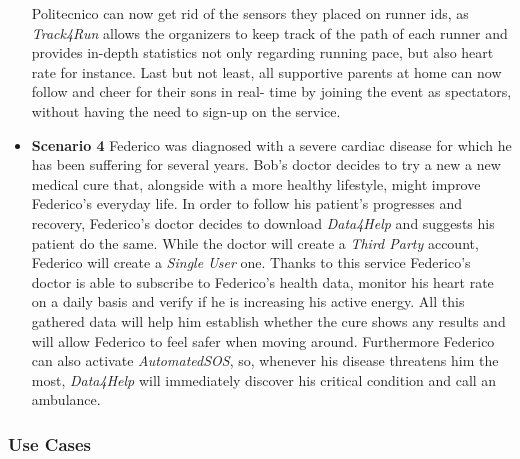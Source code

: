 \documentclass[titlepage]{article}
\begin{document}
\begin{itemize}
					Politecnico can now get rid of the sensors they placed on runner ids, as {\it Track4Run} allows the 						organizers to keep track of the path of each runner and provides in-depth statistics not only 						regarding running pace, but also heart rate for instance. 
					Last but not least, all supportive parents at home can now follow and cheer for their sons in real-					time by joining the event as spectators, without having the need to sign-up on the service.
					\item {\bf Scenario 4} \linebreak
					Federico was diagnosed with a severe cardiac disease for which he has been suffering for several 					years. Bob’s doctor decides to try a new a new medical cure that, alongside with a more healthy 					lifestyle, might improve Federico’s everyday life. In order to follow his patient’s progresses and 						recovery, Federico’s doctor decides to download {\it Data4Help} and suggests his patient do the same. 					While the doctor will create a {\it Third Party} account, Federico will create a {\it Single User} one. Thanks to 					this service Federico’s doctor is able to subscribe to Federico’s health data, monitor his heart rate 					on a daily basis and verify if he is increasing his active energy. All this gathered data will help him 					establish whether the cure shows any results and will allow Federico to feel safer when moving 					around. Furthermore Federico can also activate {\it AutomatedSOS}, so, whenever his disease 						threatens him the most, {\it Data4Help} will immediately discover his critical condition and call an 						ambulance.
				\end{itemize}	
			
		\subsubsection{Use Cases}
		
		
\end{document}
